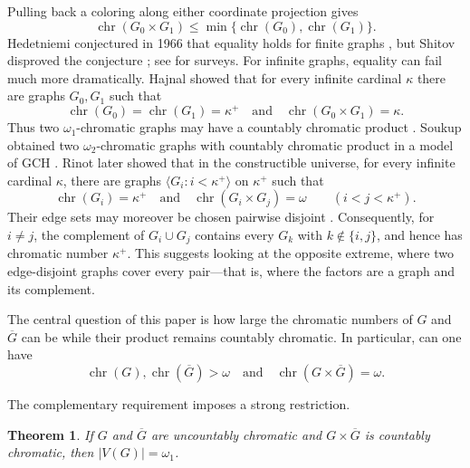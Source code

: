 \documentclass[10pt,a4paper]{amsart}
\numberwithin{equation}{section}
\newtheorem{theorem}{Theorem}[section]
\theoremstyle{definition}
\theoremstyle{remark}
\newcommand{\chr}{\operatorname{chr}}
\begin{document}
Pulling back a coloring along either coordinate projection gives
\begin{displaymath}
 \chr(G_0\times G_1)\leq
 \min\{\chr(G_0),\chr(G_1)\}.
\end{displaymath}
Hedetniemi conjectured in 1966 that equality holds for finite graphs
\cite{Hedetniemi1966}, but Shitov disproved the conjecture
\cite{Shitov2019}; see \cite{Sauer2001,Zhu2025} for surveys.  For
infinite graphs, equality can fail much more dramatically.  Hajnal
showed that for every infinite cardinal $\kappa$ there are graphs
$G_0,G_1$ such that
\begin{displaymath}
 \chr(G_0)=\chr(G_1)=\kappa^+
 \quad\text{and}\quad
 \chr(G_0\times G_1)=\kappa.
\end{displaymath}
Thus two $\omega_1$-chromatic graphs may have a countably chromatic
product \cite{Hajnal1985}.  Soukup obtained two $\omega_2$-chromatic
graphs with countably chromatic product in a model of GCH
\cite{Soukup1988}.  Rinot later showed that in the constructible
universe, for every infinite cardinal $\kappa$, there are graphs
$\langle G_i:i<\kappa^+\rangle$ on $\kappa^+$ such that
\begin{displaymath}
 \chr(G_i)=\kappa^+
 \quad\text{and}\quad
 \chr(G_i\times G_j)=\omega
 \qquad(i<j<\kappa^+).
\end{displaymath}
Their edge sets may moreover be chosen pairwise disjoint
\cite{Rinot2017}.  Consequently, for $i\ne j$, the complement of
$G_i\cup G_j$ contains every $G_k$ with $k\notin\{i,j\}$, and hence has
chromatic number $\kappa^+$.  This suggests looking at the opposite
extreme, where two edge-disjoint graphs cover every pair---that is,
where the factors are a graph and its complement.

The central question of this paper is how large the chromatic numbers
of $G$ and $\overline G$ can be while their product remains countably
chromatic.  In particular, can one have
\begin{equation}\label{eq:central}
 \chr(G),\chr(\overline G)>\omega
 \quad\text{and}\quad
 \chr(G\times\overline G)=\omega.                 \tag{$*$}
\end{equation}

The complementary requirement imposes a strong restriction.

\begin{theorem}\label{thm:size-bound}
If $G$ and $\overline G$ are uncountably chromatic and
$G\times\overline G$ is countably chromatic, then
$|V(G)|=\omega_1$.
\end{theorem}
\end{document}
